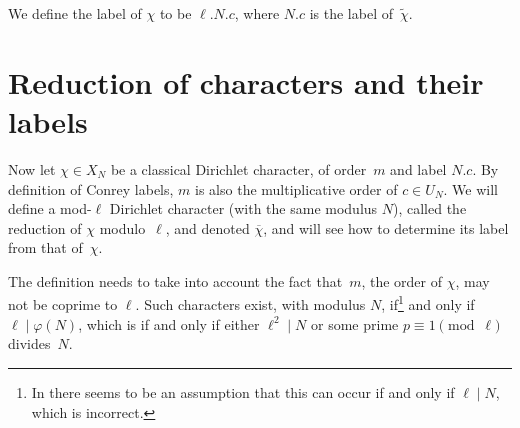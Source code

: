 \documentclass[a4paper, 10pt]{amsart}
\newcommand{\CLab}[2]{$#1.#2$}
\newcommand{\DLab}[3]{$#1.#2.#3$}
\begin{document}
We define the label of $\chi$ to be \DLab{\ell}{N}{c}, where
\CLab{N}{c} is the label of~$\tilde{\chi}$.

\section{Reduction of characters and their labels}

Now let $\chi\in X_N$ be a classical Dirichlet character, of
order~$m$ and label \CLab{N}{c}.  By definition of Conrey labels, $m$
is also the multiplicative order of $c\in U_N$.  We will define a
mod-$\ell$ Dirichlet character (with the same modulus $N$), called the
reduction of $\chi$ modulo~$\ell$, and denoted $\overline{\chi}$, and
will see how to determine its label from that of~$\chi$.

The definition needs to take into account the fact that~$m$, the order
of $\chi$, may not be coprime to $\ell$.  Such characters exist, with
modulus $N$, if\footnote{In \cite{OldDef} there seems to be an
  assumption that this can occur if and only if $\ell\mid N$, which is
  incorrect.} and only if $\ell\mid\varphi(N)$, which is if and only
if either $\ell^2\mid N$ or some prime $p\equiv1\pmod{\ell}$
divides~$N$.
\end{document}
